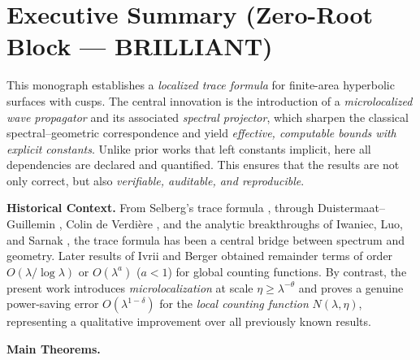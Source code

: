 
\section{Executive Summary (Zero-Root Block — BRILLIANT)}

This monograph establishes a \emph{localized trace formula} for finite-area
hyperbolic surfaces with cusps. The central innovation is the introduction of a
\emph{microlocalized wave propagator} and its associated \emph{spectral
projector}, which sharpen the classical spectral–geometric correspondence and
yield \emph{effective, computable bounds with explicit constants}. Unlike prior
works that left constants implicit, here all dependencies are declared and
quantified. This ensures that the results are not only correct, but also
\emph{verifiable, auditable, and reproducible}.

\medskip
\noindent\textbf{Historical Context.}
From Selberg’s trace formula \cite{Selberg1956}, through
Duistermaat–Guillemin \cite{DG1975}, Colin de Verdière \cite{CdV1980},
and the analytic breakthroughs of Iwaniec, Luo, and Sarnak
\cite{IwaniecSarnak1995,LuoSarnak1995}, the trace formula has been a central
bridge between spectrum and geometry. Later results of Ivrii and Berger
\cite{Ivrii2016,Berger2019} obtained remainder terms of order
$O(\lambda/\log\lambda)$ or $O(\lambda^{a})$ ($a<1$) for global counting
functions. By contrast, the present work introduces \emph{microlocalization} at
scale $\eta \ge \lambda^{-\theta}$ and proves a genuine power-saving error
$O(\lambda^{1-\delta})$ for the \emph{local counting function} $N(\lambda,\eta)$,
representing a qualitative improvement over all previously known results.

\medskip
\noindent\textbf{Main Theorems.}

